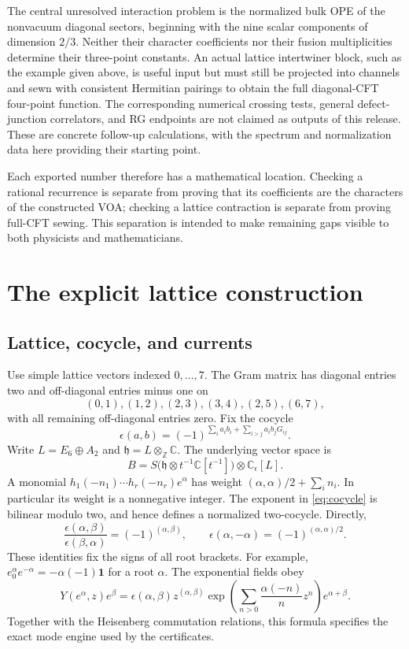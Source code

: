 \documentclass[11pt,a4paper]{article}
\theoremstyle{definition}
\newcommand{\CC}{\mathbb C}
\newcommand{\ZZ}{\mathbb Z}
\newcommand{\one}{\mathbf1}
\begin{document}
The central unresolved interaction problem is the normalized bulk OPE
of the nonvacuum diagonal sectors, beginning with the nine scalar
components of dimension $2/3$. Neither their character coefficients
nor their fusion multiplicities determine their three-point constants.
An actual lattice intertwiner block, such as the example given above,
is useful input but must still be projected into channels and sewn
with consistent Hermitian pairings to obtain the full diagonal-CFT
four-point function. The corresponding numerical crossing tests,
general defect-junction correlators, and RG endpoints are not claimed
as outputs of this release. These are concrete follow-up calculations,
with the spectrum and normalization data here providing their starting
point.

Each exported number therefore has a mathematical location. Checking a
rational recurrence is separate from proving that its coefficients are
the characters of the constructed VOA; checking a lattice contraction
is separate from proving full-CFT sewing. This separation is intended
to make remaining gaps visible to both physicists and mathematicians.


\appendix
\section{The explicit lattice construction}\label{sec:construction}
\subsection{Lattice, cocycle, and currents}
Use simple lattice vectors indexed \(0,\ldots,7\). The Gram matrix
has diagonal entries two and off-diagonal entries minus one on
\[
 (0,1),(1,2),(2,3),(3,4),(2,5),(6,7),
\]
with all remaining off-diagonal entries zero. Fix the cocycle
\begin{equation}\label{eq:cocycle}
 \epsilon(a,b)=(-1)^{\sum_i a_i b_i+
                      \sum_{i>j}a_i b_jG_{ij}}.
\end{equation}
Write $L=E_6\oplus A_2$ and $\mathfrak h=L\otimes_{\ZZ}\CC$.
The underlying vector space is
\[
 B=S\bigl(\mathfrak h\otimes t^{-1}\CC[t^{-1}]\bigr)
       \otimes\CC_\epsilon[L].
\]
A monomial $h_1(-n_1)\cdots h_r(-n_r)e^\alpha$ has weight
$(\alpha,\alpha)/2+\sum_i n_i$. In particular its weight is a
nonnegative integer. The exponent in \eqref{eq:cocycle} is bilinear
modulo two, and hence defines a normalized two-cocycle. Directly,
\[
 \frac{\epsilon(\alpha,\beta)}{\epsilon(\beta,\alpha)}
       =(-1)^{(\alpha,\beta)},\qquad
 \epsilon(\alpha,-\alpha)=(-1)^{(\alpha,\alpha)/2}.
\]
These identities fix the signs of all root brackets. For example,
$e^\alpha_0e^{-\alpha}=-\alpha(-1)\one$ for a root $\alpha$.
The exponential fields obey
\begin{equation}\label{eq:lattice-product}
 Y(e^\alpha,z)e^\beta
 =\epsilon(\alpha,\beta)z^{(\alpha,\beta)}
   \exp\!\left(\sum_{n>0}\frac{\alpha(-n)}{n}z^n\right)e^{\alpha+\beta}.
\end{equation}
Together with the Heisenberg commutation relations, this formula
specifies the exact mode engine used by the certificates.
\end{document}
